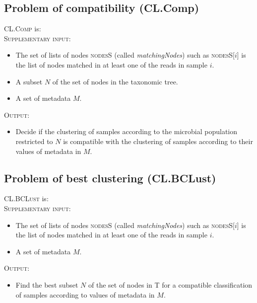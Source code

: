 \documentclass{report}
\begin{document}
\subsection{Problem of compatibility (CL.Comp)}
\textsc{CL.Comp} is:\\

\textsc{Supplementary input:} \begin{itemize}
                \item The set of lists of nodes \textsc{nodesS} (called \emph{matchingNodes}) such as \textsc{nodesS}[$i$] is the list of nodes matched in at least one of the reads in sample $i$.
                \item A subset $N$ of the set of nodes in the taxonomic tree.
                \item A set of metadata $M$.
                \end{itemize}

\bigskip

\textsc{Output:} \begin{itemize}
                 \item Decide if the clustering of samples according to the microbial population restricted to $N$ is compatible with the clustering of samples according to their values of metadata in $M$.
                 \end{itemize}

\subsection{Problem of best clustering (CL.BCLust)}
\textsc{CL.BCLust} is:\\

\textsc{Supplementary input:} 
                \begin{itemize}
                \item The set of lists of nodes \textsc{nodesS} (called \emph{matchingNodes}) such as \textsc{nodesS}[$i$] is the list of nodes matched in at least one of the reads in sample $i$.
                \item A set of metadata $M$.
                \end{itemize}

\bigskip

\textsc{Output:} \begin{itemize}
                 \item Find the best subset $N$ of the set of nodes in \textsc{T} for a compatible classification of samples according to values of metadata in $M$.
                 \end{itemize}
\end{document}

